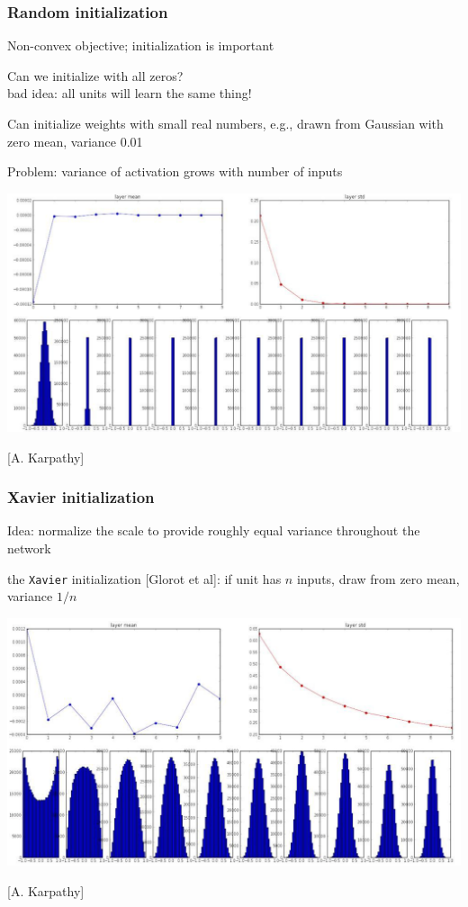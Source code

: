 \documentclass[xcolor=dvipsnames]{beamer}
\begin{document}
\begin{frame}
  \frametitle{Random initialization}
  \bi
\item Non-convex objective; initialization is important
\item Can we initialize with all zeros?\\
bad idea: all units will learn the same thing!
\item Can initialize weights with small real numbers, e.g., drawn from
  Gaussian with zero mean, variance 0.01
\item Problem: variance of activation grows with number of inputs

\includegraphics[width=.6\textwidth]{ak-layer-stats-random-init}

[A. Karpathy]
\ei
\end{frame}

\begin{frame}
  \frametitle{Xavier initialization}
  \bi
\item Idea: normalize the scale to provide roughly equal variance
  throughout the network
\item the \texttt{Xavier} initialization [Glorot et al]: if unit has
  $n$ inputs, draw from zero mean, variance $1/n$

\includegraphics[width=.6\textwidth]{ak-layer-stats-xavier-init}

[A. Karpathy]
\ei
\end{frame}
\end{document}
